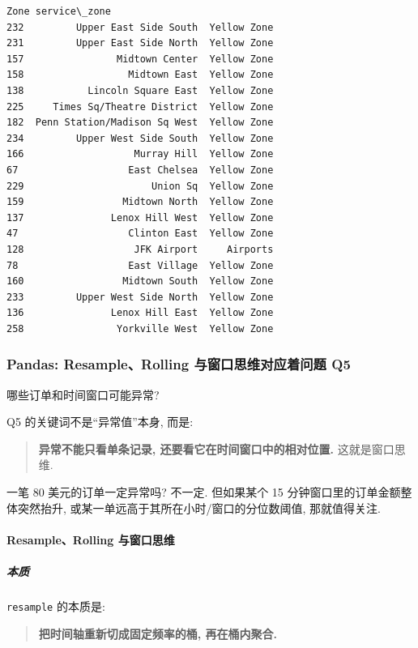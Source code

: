 \documentclass[11pt]{article}
\begin{document}
\begin{Verbatim}[commandchars=\\\{\}]
                             Zone service\_zone
232         Upper East Side South  Yellow Zone
231         Upper East Side North  Yellow Zone
157                Midtown Center  Yellow Zone
158                  Midtown East  Yellow Zone
138           Lincoln Square East  Yellow Zone
225     Times Sq/Theatre District  Yellow Zone
182  Penn Station/Madison Sq West  Yellow Zone
234         Upper West Side South  Yellow Zone
166                   Murray Hill  Yellow Zone
67                   East Chelsea  Yellow Zone
229                      Union Sq  Yellow Zone
159                 Midtown North  Yellow Zone
137               Lenox Hill West  Yellow Zone
47                   Clinton East  Yellow Zone
128                   JFK Airport     Airports
78                   East Village  Yellow Zone
160                 Midtown South  Yellow Zone
233         Upper West Side North  Yellow Zone
136               Lenox Hill East  Yellow Zone
258                Yorkville West  Yellow Zone
    \end{Verbatim}

    \subsubsection{Pandas: Resample、Rolling 与窗口思维对应着问题
Q5}\label{pandas-resamplerolling-ux4e0eux7a97ux53e3ux601dux7ef4ux5bf9ux5e94ux7740ux95eeux9898-q5}

    哪些订单和时间窗口可能异常?

Q5 的关键词不是``异常值''本身, 而是:

\begin{quote}
\textbf{异常不能只看单条记录, 还要看它在时间窗口中的相对位置.}
这就是窗口思维.
\end{quote}

一笔 80 美元的订单一定异常吗? 不一定. 但如果某个 15
分钟窗口里的订单金额整体突然抬升,
或某一单远高于其所在小时/窗口的分位数阈值, 那就值得关注.

    \paragraph{Resample、Rolling
与窗口思维}\label{resamplerolling-ux4e0eux7a97ux53e3ux601dux7ef4}

    \subparagraph{本质}\label{ux672cux8d28}

    \texttt{resample} 的本质是:

\begin{quote}
\textbf{把时间轴重新切成固定频率的桶, 再在桶内聚合.}
\end{quote}
\end{document}
